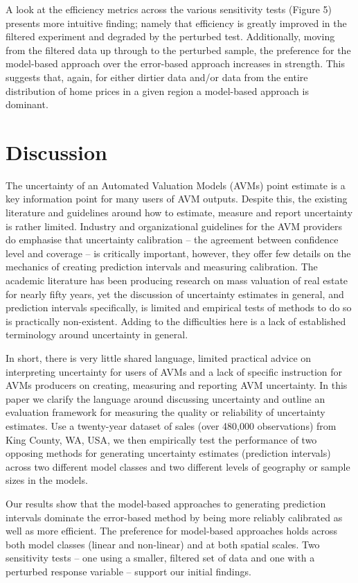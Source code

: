 \documentclass[colTwo]{anon}
\theoremstyle{definition}
\begin{document}
A look at the efficiency metrics across the various sensitivity tests (Figure 5) presents more intuitive finding; namely that efficiency is greatly improved in the filtered experiment and degraded by the perturbed test. Additionally, moving from the filtered data up through to the perturbed sample, the preference for the model-based approach over the error-based approach increases in strength.  This suggests that, again, for either dirtier data and/or data from the entire distribution of home prices in a given region a model-based approach is dominant.  

\section{Discussion}

The uncertainty of an Automated Valuation Models (AVMs) point estimate is a key information point for many users of AVM outputs.  Despite this, the existing literature and guidelines around how to estimate, measure and report uncertainty is rather limited.  Industry and organizational guidelines for the AVM providers do emphasise that uncertainty calibration -- the agreement between confidence level and coverage -- is critically important, however, they offer few details on the mechanics of creating prediction intervals and measuring calibration. The academic literature has been producing research on mass valuation of real estate for nearly fifty years, yet the discussion of uncertainty estimates in general, and prediction intervals specifically, is limited and empirical tests of methods to do so is practically non-existent.  Adding to the difficulties here is a lack of established terminology around uncertainty in general.  

In short, there is very little shared language, limited practical advice on interpreting uncertainty for users of AVMs  and a lack of specific instruction for AVMs producers on creating, measuring and reporting AVM uncertainty. In this paper we clarify the language around discussing uncertainty and outline an evaluation framework for measuring the quality or reliability of uncertainty estimates.  Use a twenty-year dataset of sales (over 480,000 observations) from King County, WA, USA, we then empirically test the performance of two opposing methods for generating uncertainty estimates (prediction intervals) across two different model classes and two different levels of geography or sample sizes in the models. 

Our results show that the model-based approaches to generating prediction intervals dominate the error-based method by being more reliably calibrated as well as more efficient.  The preference for model-based approaches holds across both model classes (linear and non-linear) and at both spatial scales. Two sensitivity tests -- one using a smaller, filtered set of data and one with a perturbed response variable -- support our initial findings.   
\end{document}
